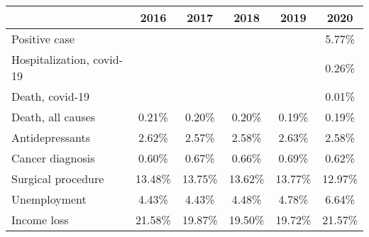
\begin{tabular}{@{}l*{5}{S[table-format={}2.2{\%}]}@{}}
\toprule
{} & {2016} & {2017} & {2018} & {2019} & {2020}\tabularnewline%
\midrule
Positive case &  &  &  &  & 5.77\%\tabularnewline%
Hospitalization, covid-19 &  &  &  &  & 0.26\%\tabularnewline%
Death, covid-19 &  &  &  &  & 0.01\%\tabularnewline%
Death, all causes & 0.21\% & 0.20\% & 0.20\% & 0.19\% & 0.19\%\tabularnewline%
Antidepressants & 2.62\% & 2.57\% & 2.58\% & 2.63\% & 2.58\%\tabularnewline%
Cancer diagnosis & 0.60\% & 0.67\% & 0.66\% & 0.69\% & 0.62\%\tabularnewline%
Surgical procedure & 13.48\% & 13.75\% & 13.62\% & 13.77\% & 12.97\%\tabularnewline%
Unemployment & 4.43\% & 4.43\% & 4.48\% & 4.78\% & 6.64\%\tabularnewline%
Income loss & 21.58\% & 19.87\% & 19.50\% & 19.72\% & 21.57\%\tabularnewline%
\bottomrule
\end{tabular}
